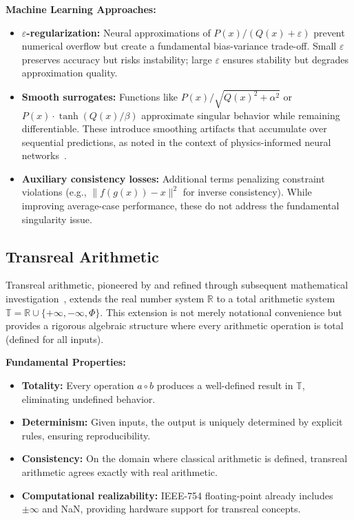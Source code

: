 \documentclass[twoside,11pt]{article}
\newcommand{\TR}{\mathbb{T}}
\newcommand{\RR}{\mathbb{R}}
\begin{document}
\textbf{Machine Learning Approaches:}
\begin{itemize}
\item \textbf{$\varepsilon$-regularization:} Neural approximations of $P(x)/(Q(x)+\varepsilon)$ prevent numerical overflow but create a fundamental bias-variance trade-off. Small $\varepsilon$ preserves accuracy but risks instability; large $\varepsilon$ ensures stability but degrades approximation quality.
\item \textbf{Smooth surrogates:} Functions like $P(x)/\sqrt{Q(x)^2 + \alpha^2}$ or $P(x)\cdot\tanh(Q(x)/\beta)$ approximate singular behavior while remaining differentiable. These introduce smoothing artifacts that accumulate over sequential predictions, as noted in the context of physics-informed neural networks~\citep{wang2021understanding}.
\item \textbf{Auxiliary consistency losses:} Additional terms penalizing constraint violations (e.g., $\|f(g(x)) - x\|^2$ for inverse consistency). While improving average-case performance, these do not address the fundamental singularity issue.
\end{itemize}
\subsection{Transreal Arithmetic}
Transreal arithmetic, pioneered by \citet{anderson2006perspex} and refined through subsequent mathematical investigation~\citep{reis2016transreal,anderson2019transmathematics}, extends the real number system $\RR$ to a total arithmetic system $\TR = \RR \cup \{+\infty, -\infty, \Phi\}$. This extension is not merely notational convenience but provides a rigorous algebraic structure where every arithmetic operation is total (defined for all inputs).

\textbf{Fundamental Properties:}
\begin{itemize}
\item \textbf{Totality:} Every operation $a \circ b$ produces a well-defined result in $\TR$, eliminating undefined behavior.
\item \textbf{Determinism:} Given inputs, the output is uniquely determined by explicit rules, ensuring reproducibility.
\item \textbf{Consistency:} On the domain where classical arithmetic is defined, transreal arithmetic agrees exactly with real arithmetic.
\item \textbf{Computational realizability:} IEEE-754 floating-point already includes $\pm\infty$ and NaN, providing hardware support for transreal concepts.
\end{itemize}
\end{document}
